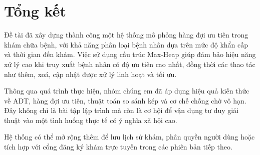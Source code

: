 \section{Tổng kết}
\thispagestyle{empty}
Đề tài đã xây dựng thành công một hệ thống mô phỏng hàng đợi ưu tiên trong khám chữa bệnh, với khả năng phân loại bệnh nhân dựa trên mức độ khẩn cấp và thời gian đến khám. Việc sử dụng cấu trúc Max-Heap giúp đảm bảo hiệu năng xử lý cao khi truy xuất bệnh nhân có độ ưu tiên cao nhất, đồng thời các thao tác như thêm, xoá, cập nhật được xử lý linh hoạt và tối ưu.

Thông qua quá trình thực hiện, nhóm chúng em đã áp dụng hiệu quả kiến thức về ADT, hàng đợi ưu tiên, thuật toán so sánh kép và cơ chế chống chờ vô hạn. Đây không chỉ là bài tập lập trình mà còn là cơ hội để vận dụng tư duy giải thuật vào một tình huống thực tế có ý nghĩa xã hội cao.

Hệ thống có thể mở rộng thêm để lưu lịch sử khám, phân quyền người dùng hoặc tích hợp với cổng đăng ký khám trực tuyến trong các phiên bản tiếp theo.

\newpage